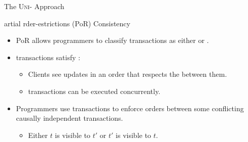 
\begin{frame}{The \textsc{Uni-} Approach}
  \begin{center}
    {artial rder-estrictions (PoR) Consistency} \\[3pt]
  \end{center}

  \pause
  \begin{itemize}
    \setlength{\itemsep}{8pt}
    \item PoR allows programmers to classify transactions as either 
          or . \pause
    \item {} transactions satisfy \cc:
          \begin{itemize}
            \item Clients see updates in an order that respects the 
                  between them. \\[3pt]
            \item {} transactions can be executed concurrently.
          \end{itemize}
          \pause
    \item Programmers use  transactions to enforce orders between
          some conflicting causally independent transactions.
          \begin{itemize}
            \item Either $t$ is visible to $t'$ or $t'$ is visible to $t$.
          \end{itemize}
  \end{itemize}
\end{frame}

